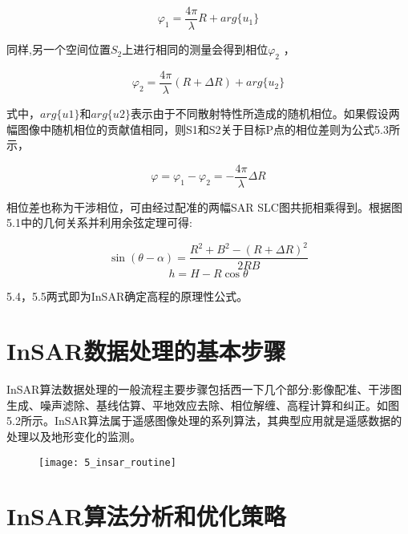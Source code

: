 \begin{equation} \label{eq:eq1}
	\varphi_1=\frac{4\pi}{\lambda}R+arg\{u_1\}
\end{equation}

同样,另一个空间位置$S_2$上进行相同的测量会得到相位$\varphi_2$ ，

\begin{equation} \label{eq:eq2}
	\varphi_2=\frac{4\pi}{\lambda}(R+\Delta R)+arg\{u_2\}
\end{equation}

式中，$arg\{u1\}$和$arg\{u2\}$表示由于不同散射特性所造成的随机相位。如果假设两幅图像中随机相位的贡献值相同，则S1和S2关于目标P点的相位差则为公式5.3所示，

 \begin{equation} \label{eq:eq3}
	\varphi=\varphi_1-\varphi_2=-\frac{4\pi}{\lambda}\Delta R
\end{equation}

相位差也称为干涉相位，可由经过配准的两幅SAR SLC图共扼相乘得到。根据图5.1中的几何关系并利用余弦定理可得: 

\begin{equation} \label{eq:eq4}
	\sin(\theta-\alpha)=\frac{R^2+B^2-(R+\Delta R)^2}{2RB}
\end{equation}
\begin{equation} \label{eq:eq5}
	h=H-R\cos\theta
\end{equation}

5.4，5.5两式即为InSAR确定高程的原理性公式。

\section{InSAR数据处理的基本步骤}

InSAR算法数据处理的一般流程主要步骤包括西一下几个部分:影像配准、干涉图生成、噪声滤除、基线估算、平地效应去除、相位解缠、高程计算和纠正。如图5.2所示。InSAR算法属于遥感图像处理的系列算法，其典型应用就是遥感数据的处理以及地形变化的监测。 

\begin{figure}[!htbp]
    \centering
    \texttt{[image: 5\_insar\_routine]}
    \label{fig:5_insar_routine}
\end{figure}

\section{InSAR算法分析和优化策略}

